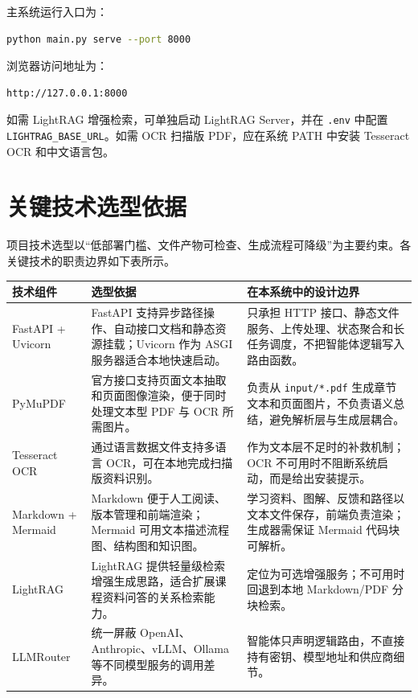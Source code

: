 \documentclass[UTF8,fontset=windows,zihao=-4,openany]{ctexrep}
\begin{document}
主系统运行入口为：

\begin{lstlisting}[language=bash]
python main.py serve --port 8000
\end{lstlisting}

浏览器访问地址为：

\begin{lstlisting}
http://127.0.0.1:8000
\end{lstlisting}

如需 LightRAG 增强检索，可单独启动 LightRAG Server，并在 \texttt{.env} 中配置 \texttt{LIGHTRAG\_BASE\_URL}。如需 OCR 扫描版 PDF，应在系统 PATH 中安装 Tesseract OCR 和中文语言包。

\section{关键技术选型依据}

项目技术选型以“低部署门槛、文件产物可检查、生成流程可降级”为主要约束。各关键技术的职责边界如下表所示。

\begin{longtable}{p{}p{}p{}}
\toprule
技术组件 & 选型依据 & 在本系统中的设计边界\\
\midrule
FastAPI + Uvicorn & FastAPI 支持异步路径操作、自动接口文档和静态资源挂载；Uvicorn 作为 ASGI 服务器适合本地快速启动。 & 只承担 HTTP 接口、静态文件服务、上传处理、状态聚合和长任务调度，不把智能体逻辑写入路由函数。\\
PyMuPDF & 官方接口支持页面文本抽取和页面图像渲染，便于同时处理文本型 PDF 与 OCR 所需图片。 & 负责从 \texttt{input/*.pdf} 生成章节文本和页面图片，不负责语义总结，避免解析层与生成层耦合。\\
Tesseract OCR & 通过语言数据文件支持多语言 OCR，可在本地完成扫描版资料识别。 & 作为文本层不足时的补救机制；OCR 不可用时不阻断系统启动，而是给出安装提示。\\
Markdown + Mermaid & Markdown 便于人工阅读、版本管理和前端渲染；Mermaid 可用文本描述流程图、结构图和知识图。 & 学习资料、图解、反馈和路径以文本文件保存，前端负责渲染；生成器需保证 Mermaid 代码块可解析。\\
LightRAG & LightRAG 提供轻量级检索增强生成思路，适合扩展课程资料问答的关系检索能力。 & 定位为可选增强服务；不可用时回退到本地 Markdown/PDF 分块检索。\\
LLMRouter & 统一屏蔽 OpenAI、Anthropic、vLLM、Ollama 等不同模型服务的调用差异。 & 智能体只声明逻辑路由，不直接持有密钥、模型地址和供应商细节。\\
\bottomrule
\end{longtable}
\end{document}
